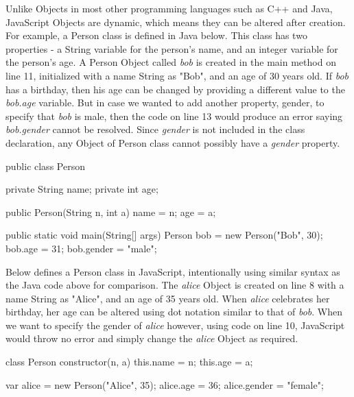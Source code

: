 \documentclass[a4paper,11pt,twoside]{report}
\begin{document}
Unlike Objects in most other programming languages such as C++ and Java, JavaScript Objects are dynamic, which means they can be altered after creation. For example, a Person class is defined in Java below. This class has two properties - a String variable for the person's name, and an integer variable for the person's age. A Person Object called \textit{bob} is created in the main method on line 11, initialized with a name String as "Bob", and an age of 30 years old. If \textit{bob} has a birthday, then his age can be changed by providing a different value to the \textit{bob.age} variable. But in case we wanted to add another property, gender, to specify that \textit{bob} is male, then the code on line 13 would produce an error saying \textit{bob.gender} cannot be resolved. Since \textit{gender} is not included in the class declaration, any Object of Person class cannot possibly have a \textit{gender} property.

\begin{adjustwidth}{4cm}{4cm}
\begin{lstjs}
public class Person {
    private String name;
    private int age;
    
    public Person(String n, int a) {
        name = n;
        age = a;
    }
    
    public static void main(String[] args) {
        Person bob = new Person("Bob", 30);
        bob.age = 31;
        bob.gender = "male";
    }
}
\end{lstjs}
\end{adjustwidth}

Below defines a Person class in JavaScript, intentionally using similar syntax as the Java code above for comparison. The \textit{alice} Object is created on line 8 with a name String as "Alice", and an age of 35 years old. When \textit{alice} celebrates her birthday, her age can be altered using dot notation similar to that of \textit{bob}. When we want to specify the gender of \textit{alice} however, using code on line 10, JavaScript would throw no error and simply change the \textit{alice} Object as required.
\begin{adjustwidth}{4cm}{4cm}
\begin{lstjs}
class Person {
	constructor(n, a) {
		this.name = n;
		this.age = a;
	}
}

var alice = new Person("Alice", 35);
alice.age = 36;
alice.gender = "female";
\end{lstjs}
\end{adjustwidth}
\end{document}
